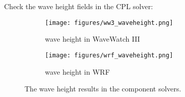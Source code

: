 
Check the wave height fields in the CPL solver:

\begin{figure}[h!]
\centering
  \begin{subfigure}[b]{0.4\linewidth}
  \texttt{[image: figures/ww3\_waveheight.png]}
  \caption{wave height in WaveWatch III}
  \end{subfigure}
  \begin{subfigure}[b]{0.4\linewidth}
  \texttt{[image: figures/wrf\_waveheight.png]}
  \caption{wave height in WRF}
  \end{subfigure}
\caption{The wave height results in the component solvers.}
\label{fig:wh}
\end{figure}

